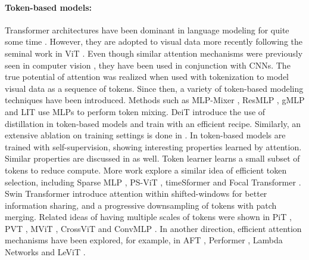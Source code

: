 \documentclass[10pt,twocolumn,letterpaper]{article}
\begin{document}
\paragraph{Token-based models:} Transformer architectures have been dominant in language modeling for quite some time \cite{vaswani2017attention, devlin2018bert}.
However, they are adopted to visual data more recently following the seminal work in ViT \cite{dosovitskiy2020image}. 
Even though similar attention mechanisms were previously seen in computer vision \cite{wang2018non, hu2018squeeze, zhao2020exploring}, they have been used in conjunction with CNNs. The true potential of attention was realized when used with tokenization to model visual data as a sequence of tokens. Since then, a variety of token-based modeling techniques have been introduced.
Methods such as MLP-Mixer \cite{tolstikhin2021mixer}, ResMLP \cite{touvron2021resmlp}, gMLP \cite{liu2021pay} and LIT \cite{pan2021less} use MLPs to perform token mixing. 
DeiT \cite{touvron2021deit} introduce the use of distillation in token-based models and train with an efficient recipe. Similarly, an extensive ablation on training settings is done in \cite{steiner2021train}. 
In \cite{caron2021emerging, chen2021empirical} token-based models are trained with self-supervision, showing interesting properties learned by attention. Similar properties are discussed in \cite{touvron2021going, naseer2021intriguing} as well.
Token learner \cite{ryoo2021tokenlearner} learns a small subset of tokens to reduce compute. More work explore a similar idea of efficient token selection, including Sparse MLP \cite{tang2021sparse}, PS-ViT \cite{yue2021vision}, timeSformer \cite{bertasius2021space} and Focal Transformer \cite{yang2021focal}. 
Swin Transformer \cite{liu2021swin} introduce attention within shifted-windows for better information sharing, and a progressive downsampling of tokens with patch merging. 
Related ideas of having multiple scales of tokens were shown in PiT \cite{heo2021rethinking}, PVT \cite{wang2021pyramid}, MViT \cite{fan2021multiscale}, CrossViT \cite{chen2021crossvit} and ConvMLP \cite{li2021convmlp}.
In another direction, efficient attention mechanisms have been explored, for example, in AFT \cite{zhai2021attention}, Performer \cite{choromanski2020rethinking}, Lambda Networks \cite{bello2021lambdanetworks} and LeViT \cite{graham2021levit}. 
\end{document}

